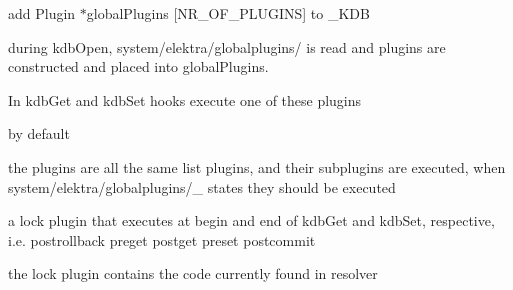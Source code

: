 \begin{DoxyItemize}
\item add {\ttfamily Plugin $\ast$global\+Plugins \mbox{[}N\+R\+\_\+\+O\+F\+\_\+\+P\+L\+U\+G\+I\+N\+S\mbox{]}} to {\ttfamily \+\_\+\+K\+D\+B}
\item during {\ttfamily kdb\+Open}, {\ttfamily system/elektra/globalplugins/} is read and plugins are constructed and placed into {\ttfamily global\+Plugins}.
\item In kdb\+Get and kdb\+Set hooks execute one of these plugins
\item by default
\begin{DoxyItemize}
\item the plugins are all the same {\ttfamily list} plugins, and their subplugins are executed, when {\ttfamily system/elektra/globalplugins/\+\_\+} states they should be executed
\item a {\ttfamily lock} plugin that executes at begin and end of kdb\+Get and kdb\+Set, respective, i.\+e. postrollback preget postget preset postcommit
\item the {\ttfamily lock} plugin contains the code currently found in resolver 
\end{DoxyItemize}
\end{DoxyItemize}
